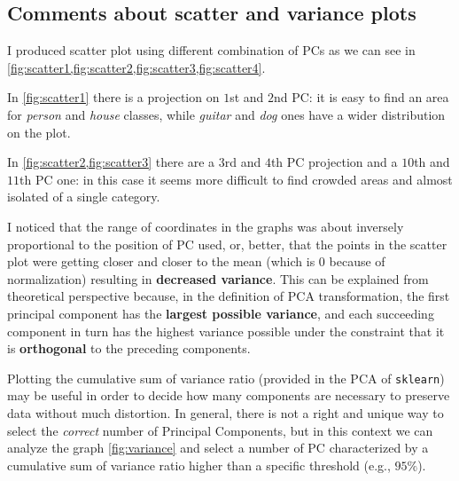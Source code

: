 \documentclass[a4paper, 11pt]{article}
\begin{document}
	\subsection{Comments about scatter and variance plots}
	I produced scatter plot using different combination of PCs as we can see in \vref{fig:scatter1,fig:scatter2,fig:scatter3,fig:scatter4}.
	
	In \vref{fig:scatter1} there is a projection on $1$st and $2$nd PC: it is easy to find an area for \textit{person} and \textit{house} classes, while \textit{guitar} and \textit{dog} ones have a wider distribution on the plot.
	
	In \vref{fig:scatter2,fig:scatter3} there are a $3$rd and $4$th PC projection and a $10$th and $11$th PC one: in this case it seems more difficult to find crowded areas and almost isolated of a single category.
	
	I noticed that the range of coordinates in the graphs was about inversely proportional to the position of PC used, or, better, that the points in the scatter plot were getting closer and closer to the mean (which is $0$ because of normalization) resulting in \textbf{decreased variance}. This can be explained from theoretical perspective because, in the definition of PCA transformation, the first principal component has the \textbf{largest possible variance}, and each succeeding component in turn has the highest variance possible under the constraint that it is \textbf{orthogonal} to the preceding components.
	
	Plotting the cumulative sum of variance ratio (provided in the PCA of \texttt{sklearn}) may be useful in order to decide how many components are necessary to preserve data without much distortion. In general, there is not a right and unique way to select the \textit{correct} number of Principal Components, but in this context we can analyze the graph \vref{fig:variance} and select a number of PC characterized by a cumulative sum of variance ratio higher than a specific threshold (e.g., $95\%$).
	
\end{document}
